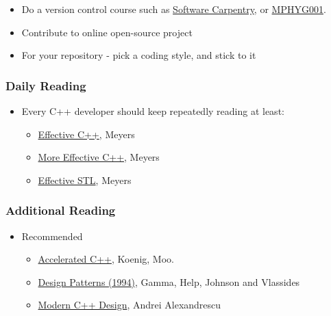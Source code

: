 \begin{itemize}
\itemsep1pt\parskip0pt
\item
  Do a version control course such as
  \href{https://www.ucl.ac.uk/isd/services/research-it/training/courses/software-carpentry-workshop}{Software
  Carpentry}, or
  \href{http://github-pages.ucl.ac.uk/rsd-engineeringcourse/}{MPHYG001}.
\item
  Contribute to online open-source project
\item
  For your repository - pick a coding style, and stick to it
\end{itemize}

\subsubsection{Daily Reading}\label{daily-reading}

\begin{itemize}
\itemsep1pt\parskip0pt
\item
  Every C++ developer should keep repeatedly reading at least:

  \begin{itemize}
  \itemsep1pt\parskip0pt
  \item
    \href{http://www.aristeia.com/books.html}{Effective C++}, Meyers
  \item
    \href{http://www.aristeia.com/books.html}{More Effective C++},
    Meyers
  \item
    \href{http://www.aristeia.com/books.html}{Effective STL}, Meyers
  \end{itemize}
\end{itemize}

\subsubsection{Additional Reading}\label{additional-reading}

\begin{itemize}
\itemsep1pt\parskip0pt
\item
  Recommended

  \begin{itemize}
  \itemsep1pt\parskip0pt
  \item
    \href{https://www.amazon.co.uk/Accelerated-Practical-Programming-Example-Depth/dp/020170353X/ref=sr_1_5?ie=UTF8\&qid=1484566101\&sr=8-5\&keywords=Moo+C\%2B\%2B}{Accelerated
    C++}, Koenig, Moo.
  \item
    \href{https://www.amazon.co.uk/Design-patterns-elements-reusable-object-oriented-x/dp/0201633612/ref=sr_1_1?ie=UTF8\&qid=1484566062\&sr=8-1\&keywords=Design+Patterns}{Design
    Patterns (1994)}, Gamma, Help, Johnson and Vlassides
  \item
    \href{https://www.amazon.co.uk/Modern-Design-Generic-Programming-Patterns/dp/0201704315/ref=sr_1_2?ie=UTF8\&qid=1484566008\&sr=8-2\&keywords=Modern+C\%2B\%2B}{Modern
    C++ Design}, Andrei Alexandrescu
  \end{itemize}
\end{itemize}

